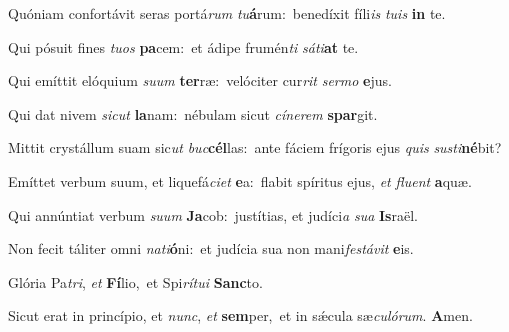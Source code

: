 ﻿\setcounter{versecount}{2}

\vs Quóniam confortávit seras port\-á\-\textit{rum} \textit{tu}\textbf{á}rum:~\redgreheightstar benedíxit fíli\textit{is} \textit{tu}\textit{is} \textbf{in} te.

\vs Qui pósuit fines \textit{tu}\textit{os} \textbf{pa}cem:~\redgreheightstar et ádipe frumén\textit{ti} \textit{sá}\textit{ti}\textbf{at} te.

\vs Qui emíttit elóquium \textit{su}\textit{um} \textbf{ter}ræ:~\redgreheightstar velóciter cur\textit{rit} \textit{ser}\textit{mo} \textbf{e}jus.

\vs Qui dat nivem \textit{sic}\textit{ut} \textbf{la}nam:~\redgreheightstar nébulam sicut \textit{cí}\textit{ne}\textit{rem} \textbf{spar}git.

\vs Mittit crystállum suam sic\textit{ut} \textit{buc}\-\textbf{cél}\-las:~\redgreheightstar ante fáciem frígoris ejus \textit{quis} \textit{sus}\-\textit{ti}\-\textbf{né}\-bit?

\vs Emíttet verbum suum, et liquefá\textit{ci}\textit{et} \textbf{e}a:~\redgreheightstar flabit spíritus ejus, \textit{et} \textit{flu}\textit{ent} \textbf{a}quæ.

\vs Qui annúntiat verbum \textit{su}\textit{um} \textbf{Ja}\-cob:~\redgreheightstar justítias, et judíci\textit{a} \textit{su}\textit{a} \textbf{Is}raël.

\vs Non fecit táliter omni \textit{na}\textit{ti}\textbf{ó}ni:~\redgreheightstar et judícia sua non mani\textit{fes}\textit{tá}\textit{vit} \textbf{e}is.

\vs Glória Pa\textit{tri}, \textit{et} \textbf{Fí}lio,~\redgreheightstar et Spi\textit{rí}\textit{tu}\textit{i} \textbf{Sanc}to.

\vs Sicut erat in princípio, et \textit{nunc}, \textit{et} \textbf{sem}per,~\redgreheightstar et in sǽcula sæ\textit{cu}\textit{ló}\textit{rum}. \textbf{A}men.

